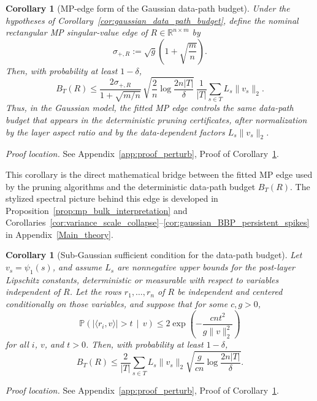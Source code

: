 \documentclass[11pt]{article}
\theoremstyle{plain}
\newtheorem{cor}[thm]{Corollary}
\theoremstyle{definition}
\theoremstyle{remark}
\newcommand{\R}{\mathbb{R}}
\newcommand{\PP}{\mathbb{P}}
\newcommand{\1}{\mathbf{1}}
\newcommand{\proofloc}[1]{\par\noindent\emph{Proof location.} #1\par}
\begin{document}
\begin{cor}[MP-edge form of the Gaussian data-path budget]
\label{cor:mp_edge_data_path_budget}
Under the hypotheses of Corollary~\ref{cor:gaussian_data_path_budget}, define the nominal rectangular MP singular-value edge of \(R\in\R^{n\times m}\) by
\[
\sigma_{+,R}:=\sqrt g\left(1+\sqrt{\frac{m}{n}}\right).
\]
Then, with probability at least \(1-\delta\),
\[
B_T(R)
\le
\frac{2\sigma_{+,R}}{1+\sqrt{m/n}}\,
\sqrt{\frac{2}{n}\log\frac{2n|T|}{\delta}}\,
\frac1{|T|}\sum_{s\in T}L_s\|v_s\|_2.
\]
Thus, in the Gaussian model, the fitted MP edge controls the same data-path budget that appears in the deterministic pruning certificates, after normalization by the layer aspect ratio and by the data-dependent factors \(L_s\|v_s\|_2\).
\end{cor}
\proofloc{See Appendix~\ref{app:proof_perturb}, Proof of Corollary~\ref{cor:mp_edge_data_path_budget}.}

This corollary is the direct mathematical bridge between the fitted MP edge used by the pruning algorithms and the deterministic data-path budget \(B_T(R)\). The stylized spectral picture behind this edge is developed in Proposition~\ref{prop:mp_bulk_interpretation} and Corollaries~\ref{cor:variance_scale_collapse}--\ref{cor:gaussian_BBP_persistent_spikes} in Appendix~\ref{Main_theory}.

\begin{cor}[Sub-Gaussian sufficient condition for the data-path budget]
\label{cor:subgaussian_data_path_budget}
Let \(v_s=\psi_1(s)\), and assume \(L_s\) are nonnegative upper bounds for the post-layer Lipschitz constants, deterministic or measurable with respect to variables independent of \(R\). Let the rows \(r_1,\dots,r_n\) of \(R\) be independent and centered conditionally on those variables, and suppose that for some \(c,g>0\),
\[
\PP\!\left(
|\langle r_i,v\rangle|>t\,\middle|\,v
\right)
\le
2\exp\!\left(
-\frac{c n t^2}{g\|v\|_2^2}
\right)
\]
for all \(i\), \(v\), and \(t>0\). Then, with probability at least \(1-\delta\),
\[
B_T(R)
\le
\frac2{|T|}
\sum_{s\in T}
L_s\|v_s\|_2
\sqrt{
\frac{g}{c n}\log\frac{2n|T|}{\delta}
}.
\]
\end{cor}
\proofloc{See Appendix~\ref{app:proof_perturb}, Proof of Corollary~\ref{cor:subgaussian_data_path_budget}.}
\end{document}

